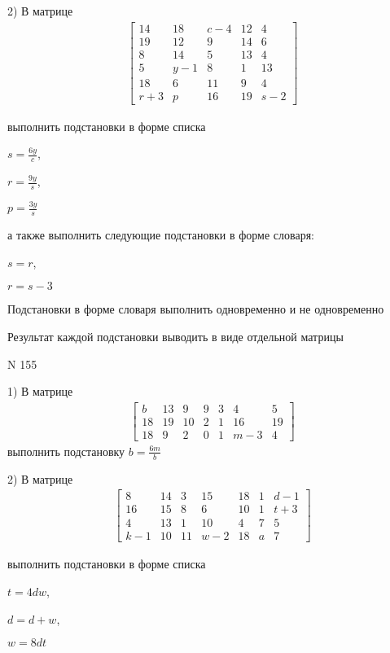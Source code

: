 \documentclass[11pt]{report}
\begin{document}
    2) В матрице
\begin{align*}
\left[\begin{matrix}14 & 18 & c - 4 & 12 & 4\\19 & 12 & 9 & 14 & 6\\8 & 14 & 5 & 13 & 4\\5 & y - 1 & 8 & 1 & 13\\18 & 6 & 11 & 9 & 4\\r + 3 & p & 16 & 19 & s - 2\end{matrix}\right]
\end{align*}

выполнить подстановки в форме списка

$s=\frac{6 y}{c}$,

$r=\frac{9 y}{s}$,

$p=\frac{3 y}{s}$

а также выполнить следующие подстановки в форме словаря:

$s=r$,

$r=s - 3$


    Подстановки в форме словаря выполнить одновременно и не одновременно


    Результат каждой подстановки выводить в виде отдельной матрицы

\newpage
N 155


    1) В матрице
\begin{align*}
\left[\begin{matrix}b & 13 & 9 & 9 & 3 & 4 & 5\\18 & 19 & 10 & 2 & 1 & 16 & 19\\18 & 9 & 2 & 0 & 1 & m - 3 & 4\end{matrix}\right]
\end{align*}
выполнить подстановку $b=\frac{6 m}{b}$


    2) В матрице
\begin{align*}
\left[\begin{matrix}8 & 14 & 3 & 15 & 18 & 1 & d - 1\\16 & 15 & 8 & 6 & 10 & 1 & t + 3\\4 & 13 & 1 & 10 & 4 & 7 & 5\\k - 1 & 10 & 11 & w - 2 & 18 & a & 7\end{matrix}\right]
\end{align*}

выполнить подстановки в форме списка

$t=4 d w$,

$d=d + w$,

$w=8 d t$
\end{document}
